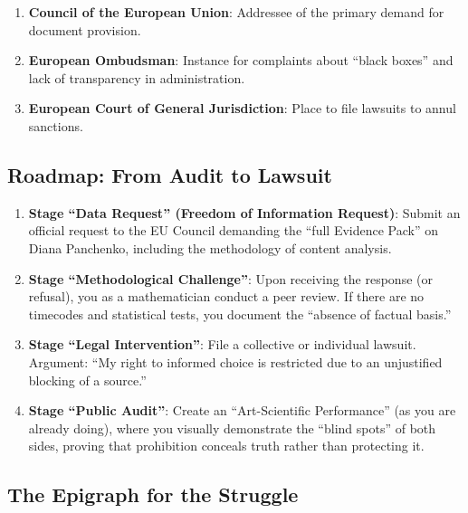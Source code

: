 \documentclass[11pt,a4paper]{article}
\theoremstyle{definition}
\theoremstyle{remark}
\begin{document}
\begin{enumerate}
\item \textbf{Council of the European Union}: Addressee of the primary demand for document provision.

\item \textbf{European Ombudsman}: Instance for complaints about ``black boxes'' and lack of transparency in administration.

\item \textbf{European Court of General Jurisdiction}: Place to file lawsuits to annul sanctions.
\end{enumerate}

\subsection{Roadmap: From Audit to Lawsuit}

\begin{enumerate}
\item \textbf{Stage ``Data Request'' (Freedom of Information Request)}: Submit an official request to the EU Council demanding the ``full Evidence Pack'' on Diana Panchenko, including the methodology of content analysis.

\item \textbf{Stage ``Methodological Challenge''}: Upon receiving the response (or refusal), you as a mathematician conduct a peer review. If there are no timecodes and statistical tests, you document the ``absence of factual basis.''

\item \textbf{Stage ``Legal Intervention''}: File a collective or individual lawsuit. Argument: ``My right to informed choice is restricted due to an unjustified blocking of a source.''

\item \textbf{Stage ``Public Audit''}: Create an ``Art-Scientific Performance'' (as you are already doing), where you visually demonstrate the ``blind spots'' of both sides, proving that prohibition conceals truth rather than protecting it.
\end{enumerate}

\subsection{The Epigraph for the Struggle}

\begin{center}
\end{center}
\end{document}
